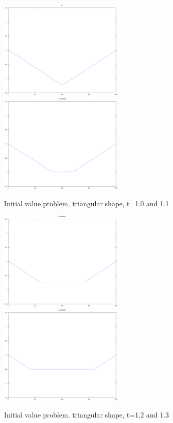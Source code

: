 \documentclass[a4paper,10pt]{report}
\begin{document}
\begin{figure}
 \includegraphics[width=6cm]{./fixed_ends_analytic_t1.eps}
\includegraphics[width=6cm]{./fixed_ends_analytic_t1.100000.eps}

\caption{Initial value problem, triangular shape, t=1.0 and 1.1}
\end{figure} 

\begin{figure}
 \includegraphics[width=6cm]{./fixed_ends_analytic_t1.200000.eps}
\includegraphics[width=6cm]{./fixed_ends_analytic_t1.300000.eps}

\caption{Initial value problem, triangular shape, t=1.2 and 1.3}
\end{figure} 
\end{document}
